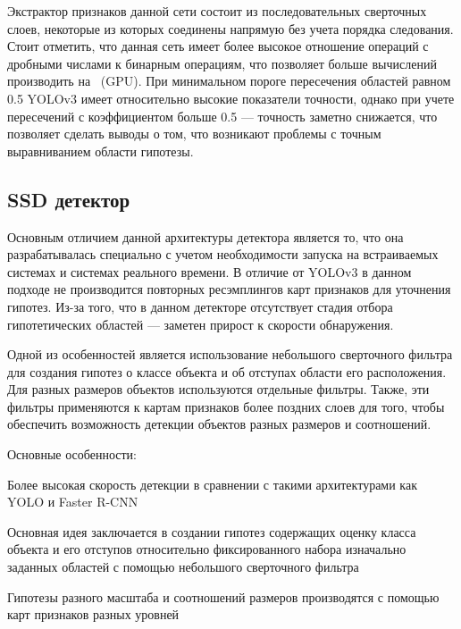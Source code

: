 Экстрактор признаков данной сети состоит из последовательных сверточных слоев, некоторые из которых соединены напрямую без учета порядка следования. Стоит отметить, что данная сеть имеет более высокое отношение операций с дробными числами к бинарным операциям, что позволяет больше вычислений производить на ~(GPU).
При минимальном пороге пересечения областей равном 0.5 YOLOv3 имеет относительно высокие показатели точности, однако при учете пересечений с коэффициентом больше 0.5 — точность заметно снижается, что позволяет сделать выводы о том, что возникают проблемы с точным выравниванием области гипотезы.

\subsection{SSD детектор}

Основным отличием данной архитектуры детектора является то, что она разрабатывалась специально с учетом необходимости запуска на встраиваемых системах и системах реального времени. В отличие от YOLOv3 в данном подходе не производится повторных ресэмплингов карт признаков для уточнения гипотез. Из-за того, что в данном детекторе отсутствует стадия отбора гипотетических областей — заметен прирост к скорости обнаружения. 

Одной из особенностей является использование небольшого сверточного фильтра для создания гипотез о классе объекта и об отступах области его расположения. Для разных размеров объектов используются отдельные фильтры. Также, эти фильтры применяются к картам признаков более поздних слоев для того, чтобы обеспечить возможность детекции объектов разных размеров и соотношений.

Основные особенности:
%
\begin{itemize*}
  \item Более высокая скорость детекции в сравнении с такими архитектурами как YOLO и Faster R-CNN
  \item Основная идея заключается в создании гипотез содержащих оценку класса объекта и его отступов относительно фиксированного набора изначально заданных областей с помощью небольшого сверточного фильтра
  \item Гипотезы разного масштаба и соотношений размеров производятся с помощью карт признаков разных уровней  
\end{itemize*}
%

